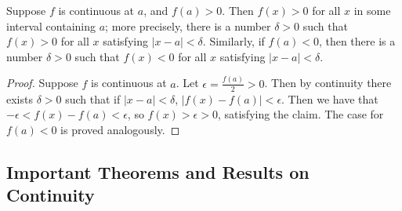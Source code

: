 \documentclass[12pt, a4paper, oneside, openright, titlepage]{book}
\begin{document}
\begin{thm}
    Suppose $f$ is continuous at $a$, and $f(a) > 0$. Then $f(x) > 0$ for all $x$ in some interval containing $a$; more precisely, there is a number $\delta > 0$ such that $f(x) > 0$ for all $x$ satisfying $|x-a| < \delta$. Similarly, if $f(a) < 0$, then there is a number $\delta > 0$ such that $f(x) < 0$ for all $x$ satisfying $|x-a| < \delta$.
\end{thm}
\begin{proof}
    Suppose $f$ is continuous at $a$. Let $\epsilon = \frac{f(a)}{2} > 0$. Then by continuity there exists $\delta > 0$ such that if $|x-a| < \delta$, $|f(x) - f(a)| < \epsilon$. Then we have that $-\epsilon < f(x) - f(a) < \epsilon$, so $f(x) > \epsilon > 0$, satisfying the claim. The case for $f(a) < 0$ is proved analogously.
\end{proof}


\subsection{Important Theorems and Results on Continuity}
\end{document}
